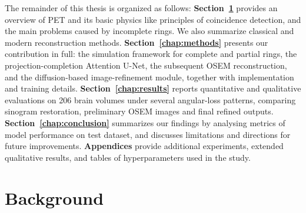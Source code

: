 \documentclass[12pt]{iopart}
\begin{document}
The remainder of this thesis is organized as follows:
\textbf{Section~\ref{chap:background}} provides an overview of PET and its basic physics like principles of coincidence detection, and the main problems caused by incomplete rings. We also summarize classical and modern reconstruction methods.
\textbf{Section~\ref{chap:methods}} presents our contribution in full: the simulation framework for complete and partial rings, the projection-completion Attention U-Net, the subsequent OSEM reconstruction, and the diffusion-based image-refinement module, together with implementation and training details.
\textbf{Section~\ref{chap:results}} reports quantitative and qualitative evaluations on 206 brain volumes under several angular-loss patterns, comparing sinogram restoration, preliminary OSEM images and final refined outputs.
\textbf{Section~\ref{chap:conclusion}} summarizes our findings by analysing metrics of model performance on test dataset, and discusses limitations and directions for future improvements.
\textbf{Appendices} provide additional experiments, extended qualitative results, and tables of hyperparameters used in the study.




\section{Background}

\label{chap:background}





\end{document}

